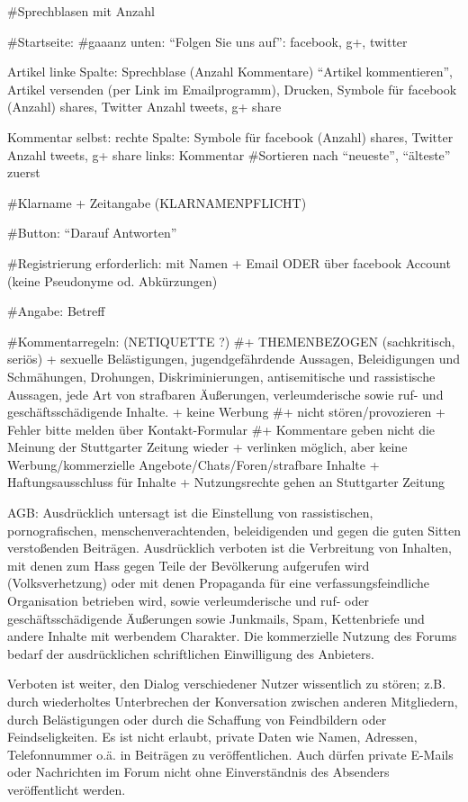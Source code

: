 #Sprechblasen mit Anzahl

#Startseite: 
#gaaanz unten: ``Folgen Sie uns auf'': facebook, g+, twitter

Artikel linke Spalte: 
Sprechblase (Anzahl Kommentare) ``Artikel kommentieren'', Artikel versenden (per Link im Emailprogramm), Drucken, Symbole für facebook  (Anzahl) shares, Twitter Anzahl tweets, g+ share

Kommentar selbst: 
rechte Spalte: Symbole für facebook  (Anzahl) shares, Twitter Anzahl tweets, g+ share
links: Kommentar
#Sortieren nach ``neueste'', ``älteste'' zuerst

#Klarname + Zeitangabe (KLARNAMENPFLICHT)

#Button: ``Darauf Antworten''

#Registrierung erforderlich: mit Namen + Email  ODER über facebook Account (keine Pseudonyme od. Abkürzungen)

#Angabe: Betreff

#Kommentarregeln: (NETIQUETTE ?)
#+ THEMENBEZOGEN (sachkritisch, seriös)
+ sexuelle Belästigungen, jugendgefährdende Aussagen, Beleidigungen und Schmähungen, Drohungen, Diskriminierungen, antisemitische und rassistische Aussagen, jede Art von strafbaren Äußerungen, verleumderische sowie ruf- und geschäftsschädigende Inhalte.
+ keine Werbung
#+ nicht stören/provozieren
+ Fehler bitte melden über Kontakt-Formular
#+ Kommentare geben nicht die Meinung der Stuttgarter Zeitung wieder
+ verlinken möglich, aber keine Werbung/kommerzielle Angebote/Chats/Foren/strafbare Inhalte
+ Haftungsausschluss für Inhalte 
+ Nutzungsrechte gehen an Stuttgarter Zeitung


AGB:
Ausdrücklich untersagt ist die Einstellung von rassistischen, pornografischen, menschenverachtenden, beleidigenden und gegen die guten Sitten verstoßenden Beiträgen. Ausdrücklich verboten ist die Verbreitung von Inhalten, mit denen zum Hass gegen Teile der Bevölkerung aufgerufen wird (Volksverhetzung) oder mit denen Propaganda für eine verfassungsfeindliche Organisation betrieben wird, sowie verleumderische und ruf- oder geschäftsschädigende Äußerungen sowie Junkmails, Spam, Kettenbriefe und andere Inhalte mit werbendem Charakter. Die kommerzielle Nutzung des Forums bedarf der ausdrücklichen schriftlichen Einwilligung des Anbieters.

Verboten ist weiter, den Dialog verschiedener Nutzer wissentlich zu stören; z.B. durch wiederholtes Unterbrechen der Konversation zwischen anderen Mitgliedern, durch Belästigungen oder durch die Schaffung von Feindbildern oder Feindseligkeiten. Es ist nicht erlaubt, private Daten wie Namen, Adressen, Telefonnummer o.ä. in Beiträgen zu veröffentlichen. Auch dürfen private E-Mails oder Nachrichten im Forum nicht ohne Einverständnis des Absenders veröffentlicht werden.

